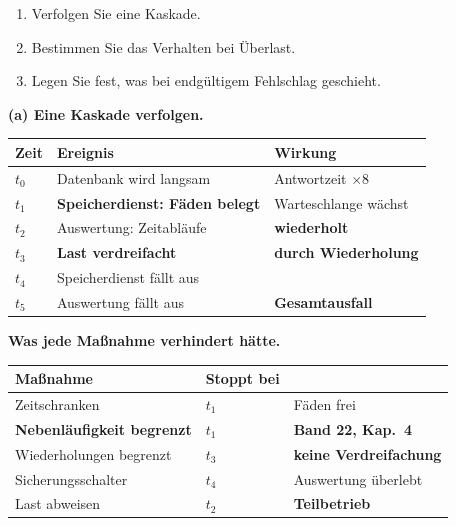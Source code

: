 \begin{aufgabe}
\begin{enumerate}[label=(\alph*)]
\item Verfolgen Sie eine Kaskade.
\item Bestimmen Sie das Verhalten bei Überlast.
\item Legen Sie fest, was bei endgültigem Fehlschlag geschieht.
\end{enumerate}

\loesung
\textbf{(a) Eine Kaskade verfolgen.}

\begin{center}
{\small
\renewcommand{\arraystretch}{1.45}
\begin{tabular}{@{}P{1.2cm}P{3.4cm}P{3.4cm}@{}}
\toprule
\textbf{Zeit} & \textbf{Ereignis} & \textbf{Wirkung}\\
\midrule
$t_0$ & Datenbank wird langsam & Antwortzeit $\times8$\\
$t_1$ & \textbf{Speicherdienst: Fäden belegt} & Warteschlange wächst\\
$t_2$ & Auswertung: Zeitabläufe & \textbf{wiederholt}\\
$t_3$ & \textcolor{akzent}{\textbf{Last verdreifacht}} & \textcolor{akzent}{\textbf{durch Wiederholung}}\\
$t_4$ & Speicherdienst fällt aus & \\
$t_5$ & \textcolor{akzent}{Auswertung fällt aus} & \textcolor{akzent}{\textbf{Gesamtausfall}}\\
\bottomrule
\end{tabular}}
\end{center}

\begin{center}
\begin{minipage}{0.88\textwidth}
\end{minipage}
\end{center}

\textbf{Was jede Maßnahme verhindert hätte.}

\begin{center}
\renewcommand{\arraystretch}{1.45}
\begin{tabular}{@{}P{2.8cm}P{2.2cm}P{2.8cm}@{}}
\toprule
\textbf{Maßnahme} & \textbf{Stoppt bei} & \\
\midrule
Zeitschranken & $t_1$ & \textcolor{gruen}{Fäden frei}\\
\textbf{Nebenläufigkeit begrenzt} & $t_1$ & \textcolor{gruen}{\textbf{Band 22, Kap.~4}}\\
Wiederholungen begrenzt & $t_3$ & \textcolor{gruen}{\textbf{keine Verdreifachung}}\\
Sicherungs\-schalter & $t_4$ & \textcolor{gruen}{Auswertung überlebt}\\
Last abweisen & $t_2$ & \textcolor{gruen}{\textbf{Teilbetrieb}}\\
\bottomrule
\end{tabular}
\end{center}


\end{aufgabe}
